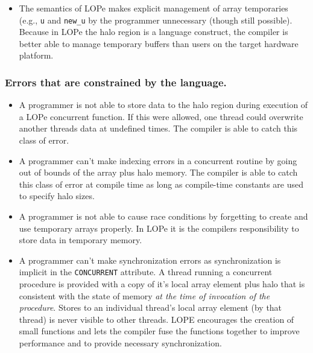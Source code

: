 \begin{itemize}
\item
The semantics of LOPe makes explicit management of array temporaries (e.g., \texttt{u} and
\texttt{new\_u} by the programmer unnecessary (though still possible).  Because in LOPe the
halo region is a language construct, the compiler is better able to manage temporary
buffers than users on the target hardware platform.

\end{itemize}

\subsubsection{Errors that are constrained by the language.}
\begin{itemize}

\item
A programmer is not able to store data to the halo region during execution of a LOPe concurrent
function.  If this were allowed, one thread could overwrite another threads data at undefined times.
The compiler is able to catch this class of error.

\item
A programmer can't make indexing errors in a concurrent routine by going out of bounds of the array
plus halo memory.  The compiler is able to catch this class of error at compile time as long as
compile-time constants are used to specify halo sizes.

\item
A programmer is not able to cause race conditions by forgetting to create and use temporary arrays
properly.  In LOPe it is the compilers responsibility to store data in temporary memory.

\item
A programmer can't make synchronization errors as synchronization is implicit in the
\texttt{CONCURRENT} attribute.  A thread running a concurrent procedure is provided with a copy of
it's local array element plus halo that is consistent with the state of memory \emph{at the time of
  invocation of the procedure}.  Stores to an individual thread's local array element (by that
thread) is never visible to other threads.  LOPE encourages the creation of small functions and lets
the compiler fuse the functions together to improve performance and to provide necessary
synchronization.

\end{itemize}
